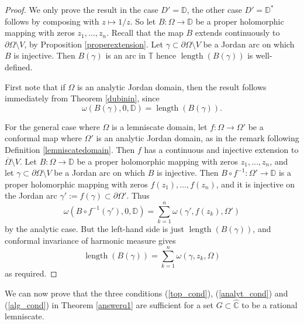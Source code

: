 \documentclass{amsart}
\theoremstyle{plain}
\theoremstyle{definition}
\theoremstyle{remark}
\newcommand{\mD}{\mathbb{D}}
\newcommand{\mT}{\mathbb{T}}
\newcommand{\hC}{\widehat{\mathbb{C}}}
\begin{document}
\begin{proof}
We only prove the result in the case $D'=\mD$, the other case $D'=\mD^*$ follows by composing with $z \mapsto 1/z$. So let $B:\Omega \to \mD$ be a proper holomorphic mapping with zeros $z_1, \dots, z_n$. Recall that the map $B$ extends continuously to $\partial \Omega \setminus V$, by Proposition \ref{properextension}. Let $\gamma \subset \partial \Omega \setminus V$ be a Jordan arc on which $B$ is injective. Then $B(\gamma)$ is an arc in $\mT$ hence $\operatorname{length}(B(\gamma))$ is well-defined.

First note that if $\Omega$ is an analytic Jordan domain, then the result follows immediately from Theorem \ref{dubinin}, since
$$\omega(B(\gamma),0,\mD) =  \operatorname{length}(B(\gamma)).$$

For the general case where $\Omega$ is a lemniscate domain, let $f:\Omega \to \Omega'$ be a conformal map where $\Omega'$ is an analytic Jordan domain, as in the remark following Definition \ref{lemniscatedomain}. Then $f$ has a continuous and injective extension to $\overline{\Omega} \setminus V$. Let $B:\Omega \to \mD$ be a proper holomorphic mapping with zeros $z_1, \dots, z_n$, and let $\gamma \subset \partial \Omega \setminus V$ be a Jordan arc on which $B$ is injective. Then $B \circ f^{-1} : \Omega' \to \mD$ is a proper holomorphic mapping with zeros $f(z_1),\dots,f(z_n)$, and it is injective on the Jordan arc $\gamma':=f(\gamma) \subset \partial \Omega'$. Thus
$$\omega(B \circ f^{-1}(\gamma'),0,\mD) = \sum_{k=1}^n \omega(\gamma',f(z_k),\Omega')$$
by the analytic case. But the left-hand side is just $\operatorname{length}(B(\gamma))$, and conformal invariance of harmonic measure gives
$$\operatorname{length}(B(\gamma)) = \sum_{k=1}^n \omega(\gamma,z_k,\Omega)$$
as required.
\end{proof}


We can now prove that the three conditions (\ref{top_cond}), (\ref{analyt_cond}) and (\ref{alg_cond}) in Theorem \ref{answerq1} are sufficient for a set $G \subset \hC$ to be a rational lemniscate.
\end{document}
